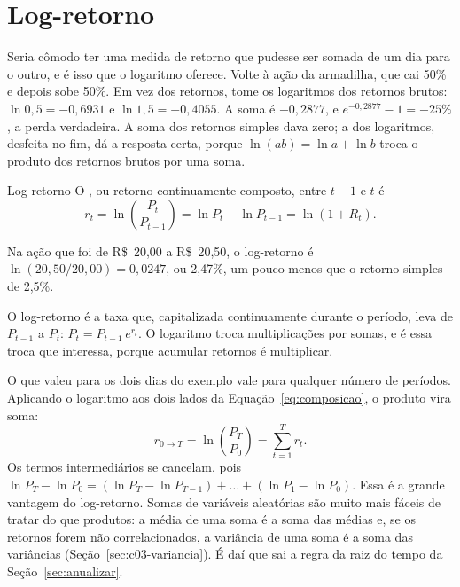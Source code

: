 \section{Log-retorno}

Seria cômodo ter uma medida de retorno que pudesse ser somada de um dia para o outro, e é isso que o logaritmo oferece. Volte à ação da armadilha, que cai 50\% e depois sobe 50\%. Em vez dos retornos, tome os logaritmos dos retornos brutos: $\ln 0,5 = -0,6931$ e $\ln 1,5 = +0,4055$. A soma é $-0,2877$, e $e^{-0,2877} - 1 = -25\%$, a perda verdadeira. A soma dos retornos simples dava zero; a dos logaritmos, desfeita no fim, dá a resposta certa, porque $\ln(ab) = \ln a + \ln b$ troca o produto dos retornos brutos por uma soma.

\begin{definicao}{Log-retorno}
O , ou retorno continuamente composto, entre $t-1$ e $t$ é
\begin{equation}
  r_t = \ln\!\left(\frac{P_t}{P_{t-1}}\right) = \ln P_t - \ln P_{t-1} = \ln(1 + R_t) .
  \label{eq:log-ret}
\end{equation}
\end{definicao}

Na ação que foi de R\$~20,00 a R\$~20,50, o log-retorno é $\ln(20,50/20,00) = 0,0247$, ou 2,47\%, um pouco menos que o retorno simples de 2,5\%.

\begin{intuicao}
O log-retorno é a taxa que, capitalizada continuamente durante o período, leva de $P_{t-1}$ a $P_t$: $P_t = P_{t-1}\, e^{r_t}$. O logaritmo troca multiplicações por somas, e é essa troca que interessa, porque acumular retornos é multiplicar.
\end{intuicao}

O que valeu para os dois dias do exemplo vale para qualquer número de períodos. Aplicando o logaritmo aos dois lados da Equação~\eqref{eq:composicao}, o produto vira soma:
\begin{equation}
  r_{0 \to T} = \ln\!\left(\frac{P_T}{P_0}\right) = \sum_{t=1}^{T} r_t .
  \label{eq:soma-logs}
\end{equation}
Os termos intermediários se cancelam, pois $\ln P_T - \ln P_0 = (\ln P_T - \ln P_{T-1}) + \dots + (\ln P_1 - \ln P_0)$. Essa  é a grande vantagem do log-retorno. Somas de variáveis aleatórias são muito mais fáceis de tratar do que produtos: a média de uma soma é a soma das médias e, se os retornos forem não correlacionados, a variância de uma soma é a soma das variâncias (Seção~\ref{sec:c03-variancia}). É daí que sai a regra da raiz do tempo da Seção~\ref{sec:anualizar}.

